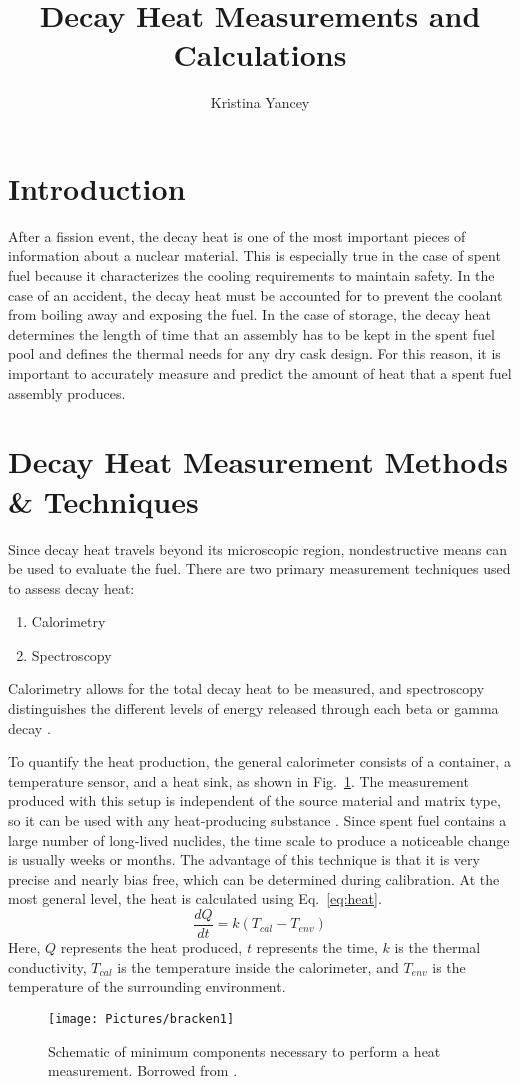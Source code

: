 \documentclass{anstrans}
\title{Decay Heat Measurements and Calculations}
\author{Kristina Yancey}
\institute{Texas A\&M University, 3133 TAMU, College Station, TX}
\begin{document}
\section{Introduction}
After a fission event, the decay heat is one of the most important pieces of information about a nuclear material. This is especially true in the case of spent fuel because it characterizes the cooling requirements to maintain safety. In the case of an accident, the decay heat must be accounted for to prevent the coolant from boiling away and exposing the fuel. In the case of storage, the decay heat determines the length of time that an assembly has to be kept in the spent fuel pool and defines the thermal needs for any dry cask design. For this reason, it is important to accurately measure and predict the amount of heat that a spent fuel assembly produces.

\section{Decay Heat Measurement Methods \& Techniques}
Since decay heat travels beyond its microscopic region, nondestructive means can be used to evaluate the fuel. There are two primary measurement techniques used to assess decay heat:
\begin{enumerate}
\item Calorimetry
\item Spectroscopy
\end{enumerate}
Calorimetry allows for the total decay heat to be measured, and spectroscopy distinguishes the different levels of energy released through each beta or gamma decay \cite{Tobi1980}.

To quantify the heat production, the general calorimeter consists of a container, a temperature sensor, and a heat sink, as shown in Fig.~\ref{fig:brac1}. The measurement produced with this setup is independent of the source material and matrix type, so it can be used with any heat-producing substance \cite{Brac2007}. Since spent fuel contains a large number of long-lived nuclides, the time scale to produce a noticeable change is usually weeks or months. The advantage of this technique is that it is very precise and nearly bias free, which can be determined during calibration. At the most general level, the heat is calculated using Eq.~\eqref{eq:heat}.
\begin{equation} \label{eq:heat}
\frac{dQ}{dt} = k (T_{cal} - T_{env})
\end{equation}
Here, $Q$ represents the heat produced, $t$ represents the time, $k$ is the thermal conductivity, $T_{cal}$ is the temperature inside the calorimeter, and $T_{env}$ is the temperature of the surrounding environment.
\begin{figure}[ht]
 \centering
 \texttt{[image: Pictures/bracken1]}
 \caption{Schematic of minimum components necessary to perform a heat measurement. Borrowed from \cite{Brac2007}.}
 \label{fig:brac1}
\end{figure}
\end{document}
